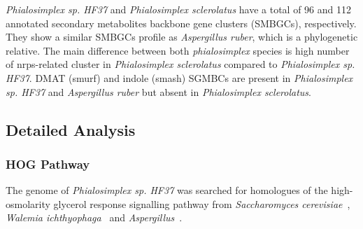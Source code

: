 \documentclass[fontsize=10pt, paper=a4,fleqn, ]{wlscirep}
\newcommand{\aspRub}{\textit{Aspergillus ruber}}
\newcommand{\walIch}{\textit{Walemia ichthyophaga}}
\newcommand{\sacCer}{\textit{Saccharomyces cerevisiae}}
\newcommand{\phiSp}{\textit{Phialosimplex sp. HF37}}
\newcommand{\phiScl}{\textit{Phialosimplex sclerolatus}}
\begin{document}
{\phiSp} and {\phiScl} have a total of 96 and 112 annotated secondary
metabolites backbone gene clusters (SMBGCs), respectively. They show a
similar SMBGCs profile as {\aspRub}, which is a phylogenetic
relative. The main difference between both \textit{phialosimplex}
species is high number of nrps-related cluster in {\phiScl} compared
to {\phiSp}. DMAT (smurf) and indole (smash) SGMBCs are present in
{\phiSp} and {\aspRub} but absent in {\phiScl}.  


\subsection{Detailed Analysis}
\subsubsection{HOG Pathway}

The genome of {\phiSp} was searched for homologues  of the high-osmolarity
glycerol response signalling pathway from {\sacCer}~\cite{Bahn2007}, {\walIch}~\cite{Zajc2014} and
\textit{Aspergillus}~\cite{Castro2014}. 
\end{document}
